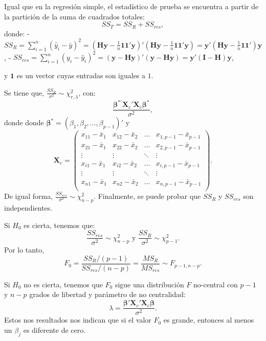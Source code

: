 \documentclass[
]{article}
\begin{document}
Igual que en la regresión simple, el estadístico de prueba se encuentra a partir de la partición de la suma de cuadrados totales:
\[
SS_{T}  = SS_{R} + SS_{res},
\]
donde:
- \(SS_{R} = \sum_{i=1}^{n}(\widehat{y}_{i}-\bar{y})^{2} = (\boldsymbol H\boldsymbol y- \frac{1}{n}\boldsymbol 1\boldsymbol 1'\boldsymbol y)'(\boldsymbol H\boldsymbol y- \frac{1}{n}\boldsymbol 1\boldsymbol 1'\boldsymbol y)=\boldsymbol y'(\boldsymbol H\boldsymbol y- \frac{1}{n}\boldsymbol 1\boldsymbol 1')\boldsymbol y\),
- \(SS_{res} = \sum_{i=1}^{n}(y_{i}-\widehat{y}_{i})^{2} = (\boldsymbol y- \boldsymbol H\boldsymbol y)'(\boldsymbol y- \boldsymbol H\boldsymbol y)=\boldsymbol y'(\boldsymbol I-\boldsymbol H)\boldsymbol y\),

y \(\boldsymbol 1\) es un vector cuyas entradas son iguales a \(1\).

Se tiene que, \(\frac{SS_{R}}{\sigma^2} \sim \chi^2_{r,\lambda}\), con:
\[
\frac{\boldsymbol \beta^{*'}\boldsymbol X_{c}'\boldsymbol X_{c}\boldsymbol \beta^{*}}{\sigma^{2}},
\]
donde donde \(\boldsymbol \beta^{*} = (\beta_{1},\beta_{2},\ldots,\beta_{p-1})'\) y
\[
\boldsymbol X_{c} = \begin{pmatrix}
x_{11} - \bar{x}_{1} & x_{12} - \bar{x}_{2} & \ldots & x_{1,p-1} - \bar{x}_{p-1} \\ 
x_{21} - \bar{x}_{1} & x_{22} - \bar{x}_{2} & \ldots & x_{2,p-1} - \bar{x}_{p-1} \\ 
\vdots & \vdots & \ddots & \vdots \\
x_{i1} - \bar{x}_{1} & x_{i2} - \bar{x}_{2} & \ldots & x_{i,p-1} - \bar{x}_{p-1} \\ 
\vdots & \vdots & \ddots & \vdots \\
x_{n1} - \bar{x}_{1} & x_{n2} - \bar{x}_{2} & \ldots & x_{n,p-1} - \bar{x}_{p-1} \\ 
\end{pmatrix}.
\]
De igual forma, \(\frac{SS_{res}}{\sigma^2} \sim \chi^2_{n-p}\). Finalmente, se puede probar que \(SS_{R}\) y \(SS_{res}\) son independientes.

Si \(H_{0}\) es cierta, tenemos que:
\[
\frac{SS_{res}}{\sigma^{2}}\sim\chi^{2}_{n-p} \mbox{ y } \frac{SS_{R}}{\sigma^{2}} \sim \chi^{2}_{p-1}.
\]
Por lo tanto,
\[
F_{0} = \frac{SS_{R}/(p-1)}{SS_{res}/(n-p)} = \frac{MS_{R}}{MS_{res}} \sim F_{p-1,n-p}.
\]

Si \(H_{0}\) no es cierta, tenemos que \(F_{0}\) sigue una distribución \(F\) no-central con \(p-1\) y \(n-p\) grados de libertad y parámetro de no centralidad:
\[
\lambda = \frac{\boldsymbol \beta'\boldsymbol X_{c}'\boldsymbol X_{c}\boldsymbol \beta}{\sigma^{2}}.
\]
Estos nos resultados nos indican que si el valor \(F_{0}\) es grande, entonces al menos un \(\beta_{j}\) es diferente de cero.
\end{document}
